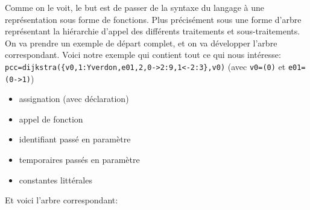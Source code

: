 \documentclass[french]{article}
\begin{document}
			Comme on le voit, le but est de passer de la syntaxe du langage à une représentation sous forme de fonctions. Plus précisément sous une forme d'arbre représentant la hiérarchie d'appel des différents traitements et sous-traitements.\\
			
			On va prendre un exemple de départ complet, et on va développer l'arbre correspondant. Voici notre exemple qui contient tout ce qui nous intéresse:\\
			
			\centering
			\texttt{pcc=dijkstra(\{v0,1:Yverdon,e01,2,0->2:9,1<-2:3\},v0)} (avec \texttt{v0=(0)} et \texttt{e01=(0->1)})
			\justify
			
			\begin{itemize}
				\item assignation (avec déclaration)
				\item appel de fonction
				\item identifiant passé en paramètre
				\item temporaires passés en paramètre
				\item constantes littérales\\
			\end{itemize}
			
			Et voici l'arbre correspondant:
			
\end{document}
